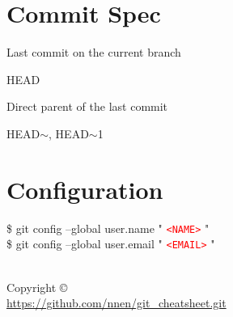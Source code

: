 \documentclass[10pt,a4paper]{article}
\newenvironment{cheatentry}{%
    \noindent%
    \begin{minipage}{\columnwidth}%
    \small%
    \noindent%
}{%
    \end{minipage}%
}
\newenvironment{cheatcmde}{%
    \noindent%
    \begin{cmdbox}%
    \begin{flushleft}%
    \bgroup%
    \setlength{\parindent}{-12pt}%
    \ttfamily\fontseries{b}\selectfont\large%
    \hspace{\parindent}%
}{%
    \egroup%
    \end{flushleft}%
    \end{cmdbox}%
}
\newcommand{\entrysep}{\vspace{1em}}
\newcommand{\cheatcmd}[1]{%
    \begin{cheatcmde}#1\end{cheatcmde}
}
\newcommand{\cheatmetavar}[1]{%
    \textcolor{red}{\texttt{\textless{}#1\textgreater{}}}%
}
\newcommand{\HEADP}[1][]{HEAD$\sim$#1}
\begin{document}
\begin{multicols}{4}
\section{Commit Spec}

\begin{cheatentry}%
Last commit on the current branch
\cheatcmd{HEAD}
\end{cheatentry}

\entrysep{}%

\begin{cheatentry}%
Direct parent of the last commit
\cheatcmd{\HEADP, \HEADP[1]}
\end{cheatentry}


\section{Configuration}

\begin{cheatentry}%
\begin{cheatcmde}%
\$ git config --global user.name "\cheatmetavar{NAME}"\\
\$ git config --global user.email "\cheatmetavar{EMAIL}"
\end{cheatcmde}%
\end{cheatentry}


\vfill

\makeatletter
\begin{flushright}\footnotesize
\@title\\
Copyright \copyright{} \@author\\
\url{https://github.com/nnen/git_cheatsheet.git}
\end{flushright}
\makeatother

\end{multicols}
\end{document}
